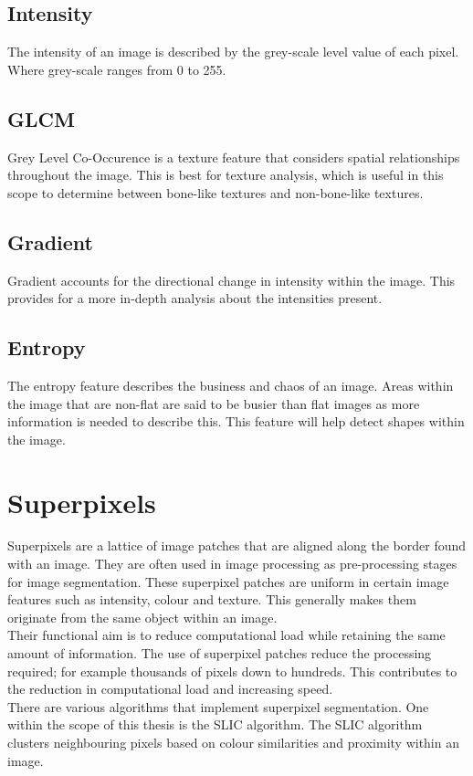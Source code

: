 \subsection{Intensity}
The intensity of an image is described by the grey-scale level value of each pixel. Where grey-scale ranges from 0 to 255. 
\subsection{GLCM}
Grey Level Co-Occurence is a texture feature that considers spatial relationships throughout the image. This is best for texture analysis, which is useful in this scope to determine between bone-like textures and non-bone-like textures. \cite{ref:glcm_1}
\subsection{Gradient}
Gradient accounts for the directional change in intensity within the image. This provides for a more in-depth analysis about the intensities present. \cite{ref:gradient_1} 
\subsection{Entropy}
The entropy feature describes the business and chaos of an image. Areas within the image that are non-flat are said to be busier than flat images as more information is needed to describe this. This feature will help detect shapes within the image. \cite{ref:ent_1}

\section{Superpixels}
Superpixels are a lattice of image patches that are aligned along the border found with an image. They are often used in image processing as pre-processing stages for image segmentation. These superpixel patches are uniform in certain image features such as intensity, colour and texture. This generally makes them originate from the same object within an image. \cite{ref:sp_2}
\\[1\baselineskip]
Their functional aim is to reduce computational load while retaining the same amount of information. The use of superpixel patches reduce the processing required; for example thousands of pixels down to hundreds. This contributes to the reduction in computational load and increasing speed. 
\\[1\baselineskip]
There are various algorithms that implement superpixel segmentation. One within the scope of this thesis is the SLIC algorithm. The SLIC algorithm clusters neighbouring pixels based on colour similarities and proximity within an image. \cite{ref:sp_1}
 
